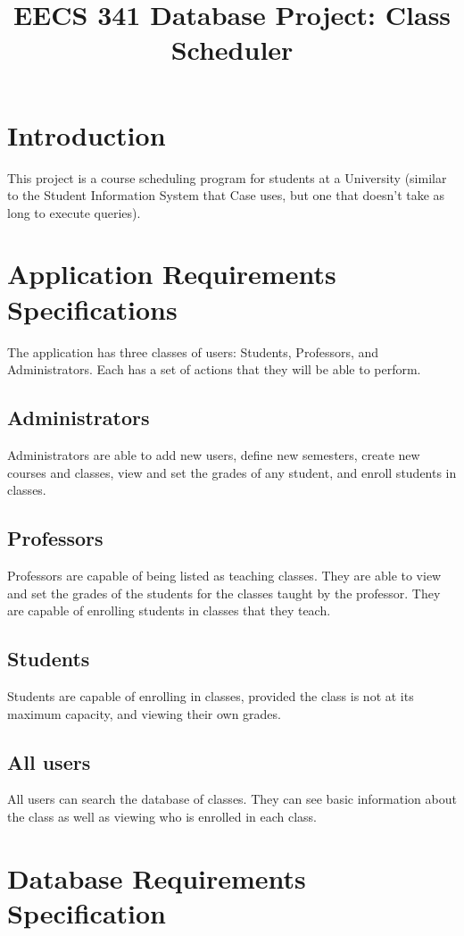 \documentclass[11pt,oneside,a4paper]{article}
\title{EECS 341 Database Project: Class Scheduler}
\begin{document}
\maketitle
\section{Introduction}
This project is a course scheduling program for students at a University
(similar to the Student Information System that Case uses, but one that doesn't
take as long to execute queries).
\section{Application Requirements Specifications}
The application has three classes of users: Students, Professors, and
Administrators. Each has a set of actions that they will be able to perform.
\subsection{Administrators}
Administrators are able to add new users, define new semesters, create new
courses and classes, view and set the grades of any student, and enroll students in
classes.
\subsection{Professors}
Professors are capable of being listed as teaching classes. They are able to
view and set the grades of the students for the classes taught by the
professor. They are capable of enrolling students in classes that they teach.
\subsection{Students}
Students are capable of enrolling in classes, provided the class is not at its
maximum capacity, and viewing their own grades.
\subsection{All users}
All users can search the database of classes. They can see basic information
about the class as well as viewing who is enrolled in each class.

\section{Database Requirements Specification}
\end{document}

